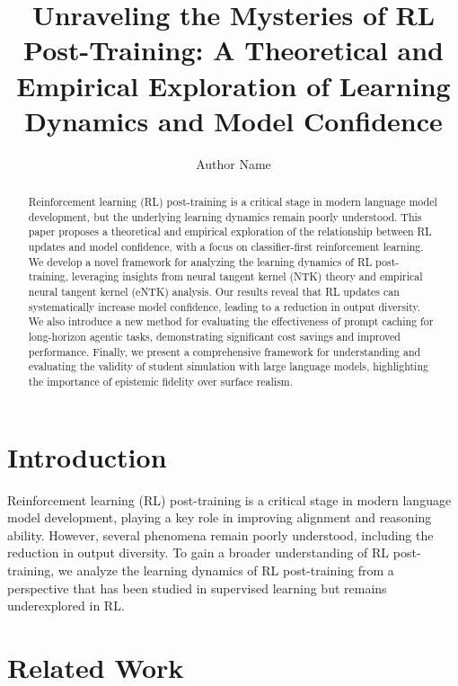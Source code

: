 \documentclass{article}
\begin{document}
\title{Unraveling the Mysteries of RL Post-Training: A Theoretical and Empirical Exploration of Learning Dynamics and Model Confidence}

\author{Author Name}

\maketitle

\begin{abstract}

Reinforcement learning (RL) post-training is a critical stage in modern language model development, but the underlying learning dynamics remain poorly understood. This paper proposes a theoretical and empirical exploration of the relationship between RL updates and model confidence, with a focus on classifier-first reinforcement learning. We develop a novel framework for analyzing the learning dynamics of RL post-training, leveraging insights from neural tangent kernel (NTK) theory and empirical neural tangent kernel (eNTK) analysis. Our results reveal that RL updates can systematically increase model confidence, leading to a reduction in output diversity. We also introduce a new method for evaluating the effectiveness of prompt caching for long-horizon agentic tasks, demonstrating significant cost savings and improved performance. Finally, we present a comprehensive framework for understanding and evaluating the validity of student simulation with large language models, highlighting the importance of epistemic fidelity over surface realism.

\end{abstract}

\section{Introduction}

Reinforcement learning (RL) post-training is a critical stage in modern language model development, playing a key role in improving alignment and reasoning ability. However, several phenomena remain poorly understood, including the reduction in output diversity. To gain a broader understanding of RL post-training, we analyze the learning dynamics of RL post-training from a perspective that has been studied in supervised learning but remains underexplored in RL.

\section{Related Work}
\end{document}
